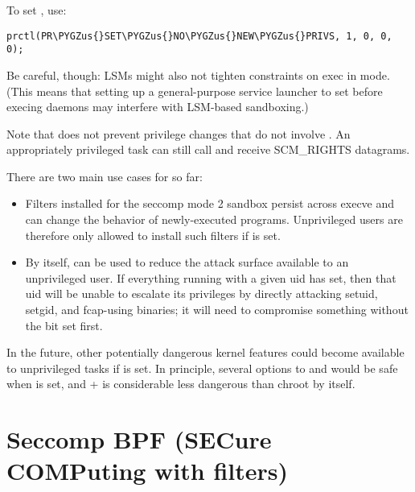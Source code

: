 \documentclass[a4paper,8pt,english]{sphinxmanual}
\def\PYGZus{\char`\_}
\begin{document}
To set , use:

\begin{Verbatim}[commandchars=\\\{\}]
prctl(PR\PYGZus{}SET\PYGZus{}NO\PYGZus{}NEW\PYGZus{}PRIVS, 1, 0, 0, 0);
\end{Verbatim}

Be careful, though: LSMs might also not tighten constraints on exec
in  mode.  (This means that setting up a general-purpose
service launcher to set  before execing daemons may
interfere with LSM-based sandboxing.)

Note that  does not prevent privilege changes that do not
involve .  An appropriately privileged task can still call
 and receive SCM\_RIGHTS datagrams.

There are two main use cases for  so far:
\begin{itemize}
\item {} 
Filters installed for the seccomp mode 2 sandbox persist across
execve and can change the behavior of newly-executed programs.
Unprivileged users are therefore only allowed to install such filters
if  is set.

\item {} 
By itself,  can be used to reduce the attack surface
available to an unprivileged user.  If everything running with a
given uid has  set, then that uid will be unable to
escalate its privileges by directly attacking setuid, setgid, and
fcap-using binaries; it will need to compromise something without the
 bit set first.

\end{itemize}

In the future, other potentially dangerous kernel features could become
available to unprivileged tasks if  is set.  In principle,
several options to  and  would be safe when
 is set, and  +  is considerable less
dangerous than chroot by itself.


\chapter{Seccomp BPF (SECure COMPuting with filters)}
\label{userspace-api/seccomp_filter::doc}\label{userspace-api/seccomp_filter:seccomp-bpf-secure-computing-with-filters}
\end{document}
